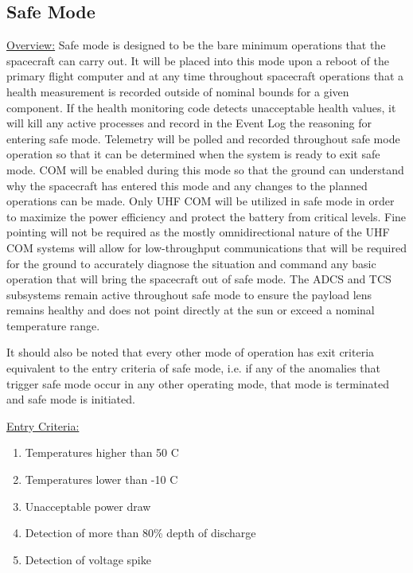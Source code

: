 \documentclass{article}
\begin{document}
\newpage

\subsection{Safe Mode}

\underline{Overview:} Safe mode is designed to be the bare minimum operations that the spacecraft can carry out. It will be placed into this mode upon a reboot of the primary flight computer and at any time throughout spacecraft operations that a health measurement is recorded outside of nominal bounds for a given component. If the health monitoring code detects unacceptable health values, it will kill any active processes and record in the Event Log the reasoning for entering safe mode. Telemetry will be polled and recorded throughout safe mode operation so that it can be determined when the system is ready to exit safe mode. COM will be enabled during this mode so that the ground can understand why the spacecraft has entered this mode and any changes to the planned operations can be made. Only UHF COM will be utilized in safe mode in order to maximize the power efficiency and protect the battery from critical levels. Fine pointing will not be required as the mostly omnidirectional nature of the UHF COM systems will allow for low-throughput communications that will be required for the ground to accurately diagnose the situation and command any basic operation that will bring the spacecraft out of safe mode. The ADCS and TCS subsystems remain active throughout safe mode to ensure the payload lens remains healthy and does not point directly at the sun or exceed a nominal temperature range.

It should also be noted that every other mode of operation has exit criteria equivalent to the entry criteria of safe mode, i.e. if any of the anomalies that trigger safe mode occur in any other operating mode, that mode is terminated and safe mode is initiated.

\underline{Entry Criteria:} 

\begin{enumerate}
\item Temperatures higher than 50 \degree C
\item Temperatures lower than -10 \degree C
\item Unacceptable power draw
\item Detection of more than 80\% depth of discharge
\item Detection of voltage spike
\end{enumerate}
\end{document}

